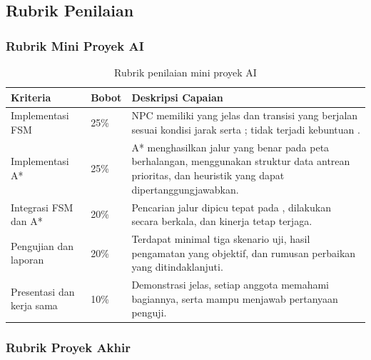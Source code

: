 \subsection{Rubrik Penilaian}

\subsubsection{Rubrik Mini Proyek AI}

\begin{table}[htbp]
\centering
\caption{Rubrik penilaian mini proyek AI}
\label{tab:rubrik-miniproyek}
\begin{tabularx}{\textwidth}{@{}L{4.4cm} C{1.6cm} Y@{}}
\toprule
\headrow \textbf{Kriteria} & \textbf{Bobot} & \textbf{Deskripsi Capaian} \\
\midrule
Implementasi FSM & 25\% &
NPC memiliki  yang jelas dan transisi yang berjalan sesuai kondisi jarak serta ; tidak terjadi kebuntuan . \\
\addlinespace
Implementasi A* & 25\% &
A* menghasilkan jalur yang benar pada peta berhalangan, menggunakan struktur data antrean prioritas, dan heuristik yang dapat dipertanggungjawabkan. \\
\addlinespace
Integrasi FSM dan A* & 20\% &
Pencarian jalur dipicu tepat pada ,  dilakukan secara berkala, dan kinerja tetap terjaga. \\
\addlinespace
Pengujian dan laporan  & 20\% &
Terdapat minimal tiga skenario uji, hasil pengamatan yang objektif, dan rumusan perbaikan yang ditindaklanjuti. \\
\addlinespace
Presentasi dan kerja sama & 10\% &
Demonstrasi jelas, setiap anggota memahami bagiannya, serta mampu menjawab pertanyaan penguji. \\
\bottomrule
\end{tabularx}
\end{table}

\subsubsection{Rubrik Proyek Akhir}

